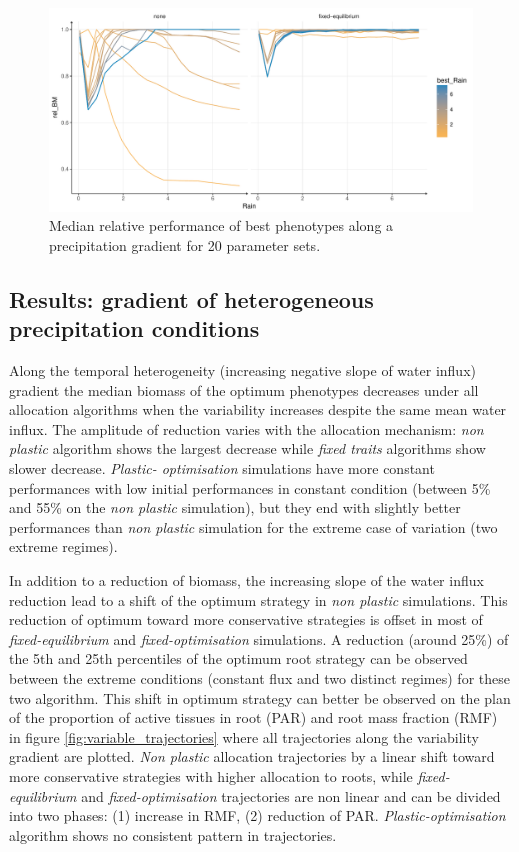 \begin{figure}\label{fig:gradient_ranking}
\includegraphics[width = \textwidth]{./2_PP/Figures/Rain/optimum_shifting_median.pdf}
\caption{Median relative performance of best phenotypes along a precipitation gradient for 20 parameter sets.}
\end{figure}


\subsection{Results: gradient of heterogeneous precipitation conditions}

Along the temporal heterogeneity (increasing negative slope of water influx) gradient the median biomass of the optimum phenotypes decreases under all allocation algorithms when the variability increases despite the same mean water influx. The amplitude of reduction varies with the allocation mechanism: \textit{non plastic} algorithm shows the largest decrease while \textit{fixed traits} algorithms show slower decrease. \textit{Plastic- optimisation} simulations have more constant performances with low initial performances in constant condition (between 5\% and 55\% on the \textit{non plastic} simulation), but they end with slightly better performances than \textit{non plastic} simulation for the extreme case of variation (two extreme regimes).

In addition to a reduction of biomass, the increasing slope of the water influx reduction lead to a shift of the optimum strategy in \textit{non plastic} simulations. This reduction of optimum toward more conservative strategies is offset in most of \textit{fixed-equilibrium} and \textit{fixed-optimisation} simulations. A reduction	(around 25\%) of the 5th and 25th percentiles of the optimum root strategy can be observed between the extreme conditions (constant flux and two distinct regimes) for these two algorithm. This shift in optimum strategy can better be observed on the plan of the proportion of active tissues in root (PAR) and root mass fraction (RMF) in figure \ref{fig:variable_trajectories} where all trajectories along the variability gradient are plotted. \textit{Non plastic} allocation trajectories by a linear shift toward more conservative strategies with higher allocation to roots, while \textit{fixed-equilibrium} and \textit{fixed-optimisation} trajectories are non linear and can be divided into two phases: (1) increase in RMF, (2) reduction of PAR. \textit{Plastic-optimisation} algorithm shows no consistent pattern in trajectories.


